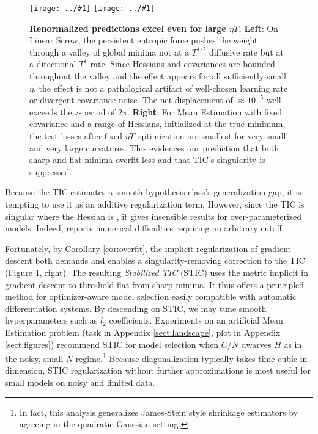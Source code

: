 \documentclass{article}
\theoremstyle{plain}
\theoremstyle{definition}
\newcommand{\plotmoow}[3]{\texttt{[image: ../\#1]}}
\begin{document}
        \begin{figure}[h!] 
            \centering
            \plotmoow{plots/new-thermo-linear-screw}{0.48\columnwidth}{4.0cm}
            \plotmoow{plots/new-tak}{0.48\columnwidth}{4.0cm}
            \caption{
                {\bf Renormalized predictions excel even for large $\eta T$.}
                {\bf Left}: On Linear Screw, the persistent entropic force
                pushes the weight through a valley of global minima not at a
                $T^{1/2}$ diffusive rate but at a directional $T^1$ rate.
                Since Hessians and covariances are bounded throughout
                the valley and the effect appears for all sufficiently small
                $\eta$, the effect is not a pathological artifact of
                well-chosen learning rate or divergent covariance noise.  The
                net displacement of $\approx 10^{1.5}$ well exceeds the
                $z$-period of $2\pi$. 
                {\bf Right}: For Mean Estimation with fixed covariance and a
                range of Hessians, initialized at the true minimum, the test
                losses after fixed-$\eta T$ optimization are smallest for very
                small and very large curvatures.  This evidences our prediction
                that both sharp and flat minima overfit less and that TIC's
                singularity is suppressed.
            }
            \label{fig:thermoandtak}
        \end{figure}

        Because the TIC estimates a smooth hypothesis class's generalization
        gap, it is tempting to use it as an additive regularization term.
        However, since the TIC is singular where the Hessian is , it gives
        insensible results for over-parameterized models.  Indeed, \citet{di18}
        reports numerical difficulties requiring an arbitrary cutoff. 

        Fortunately, by Corollary \ref{cor:overfit}, the implicit
        regularization of gradient descent both demands and enables a
        singularity-removing correction to the TIC (Figure
        \ref{fig:thermoandtak}, right).  The resulting \emph{Stabilized TIC}
        (STIC) uses the metric implicit in gradient descent to threshold flat
        from sharp minima.  It thus offers a principled method for
        optimizer-aware model selection easily compatible with automatic
        differentiation systems.  By descending on STIC, we may tune smooth
        hyperparameters such as $l_2$ coefficients.  Experiments on an
        artificial Mean Estimation problem (task in Appendix
        \ref{sect:landscape}, plot in Appendix \ref{sect:figures}) recommend
        STIC for model selection when $C/N$ dwarves $H$ as in the
        noisy, small-$N$ regime.\footnote{In fact, this analysis generalizes
        James-Stein style shrinkage estimators by agreeing in the quadratic
        Gaussian setting.} Because diagonalization typically takes time
        cubic in dimension, STIC regularization without further approximations
        is most useful for small models on noisy and limited data.
\end{document}
